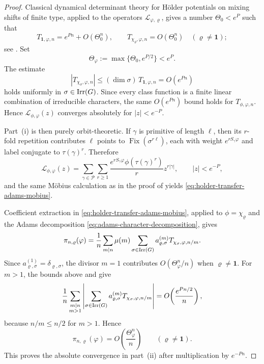 \begin{proof}
  Classical dynamical determinant theory for H\"older potentials on
  mixing shifts of finite type, applied to the operators
  \(\mathscr L_{\varphi,\varrho}\), gives a number \(\Theta_0<e^P\) such
  that
  \[
    T_{\mathbf 1,\varphi,n}=e^{Pn}+O(\Theta_0^n),
    \qquad
    T_{\chi_\varrho,\varphi,n}=O(\Theta_0^n)
    \quad (\varrho\neq\mathbf 1);
  \]
  see \cite{Ruelle1978Thermodynamic,Baladi2000PositiveTransfer,%
  Baladi2018ZetaDeterminants,AdachiSunada1987TwistedPerronFrobenius}.
  Set
  \[
    \Theta_\varphi:=\max\{\Theta_0,e^{P/2}\}<e^P.
  \]
  The estimate
  \[
    |T_{\chi_\sigma,\varphi,n}|
    \le (\dim\sigma)\,T_{\mathbf 1,\varphi,n}
    =O(e^{Pn})
  \]
  holds uniformly in \(\sigma\in\operatorname{Irr}(G)\). Since every class function is
  a finite linear combination of irreducible characters, the same
  \(O(e^{Pn})\) bound holds for \(T_{\phi,\varphi,n}\). Hence
  \(\mathcal L_{\phi,\varphi}(z)\) converges absolutely for
  \(|z|<e^{-P}\).

  Part~\textup{(i)} is then purely orbit-theoretic. If \(\gamma\) is
  primitive of length \(\ell\), then its \(r\)-fold repetition
  contributes \(\ell\) points to \(\operatorname{Fix}(\sigma^{r\ell})\),
  each with weight \(e^{rS_\gamma\varphi}\) and label conjugate to
  \(\tau(\gamma)^r\). Therefore
  \[
    \mathcal L_{\phi,\varphi}(z)
    =
    \sum_{\gamma\in\mathcal P}\sum_{r\ge 1}
      \frac{e^{rS_\gamma\varphi}\phi(\tau(\gamma)^r)}{r}z^{r|\gamma|},
    \qquad |z|<e^{-P},
  \]
  and the same M\"obius calculation as in the proof of
   yields
  \eqref{eq:holder-transfer-adams-mobius}.

  Coefficient extraction in
  \eqref{eq:holder-transfer-adams-mobius}, applied to
  \(\phi=\chi_\varrho\) and the Adams decomposition
  \eqref{eq:adams-character-decomposition}, gives
  \[
    \pi_{n,\varrho}(\varphi)
    =
    \frac{1}{n}\sum_{m\mid n}\mu(m)
      \sum_{\sigma\in\operatorname{Irr}(G)}
        a_{\varrho,\sigma}^{(m)}T_{\chi_\sigma,\varphi,n/m}.
  \]
  Since \(a_{\varrho,\sigma}^{(1)}=\delta_{\varrho,\sigma}\), the
  divisor \(m=1\) contributes \(O(\Theta_\varphi^n/n)\) when
  \(\varrho\neq\mathbf 1\). For \(m>1\), the bounds above and
   give
  \[
    \frac{1}{n}
    \sum_{\substack{m\mid n\\ m>1}}
      \left|
        \sum_{\sigma\in\operatorname{Irr}(G)}
          a_{\varrho,\sigma}^{(m)}T_{\chi_\sigma,\varphi,n/m}
      \right|
    =
    O\!\left(\frac{e^{Pn/2}}{n}\right),
  \]
  because \(n/m\le n/2\) for \(m>1\). Hence
  \[
    \pi_{n,\varrho}(\varphi)
    =O\!\left(\frac{\Theta_\varphi^n}{n}\right)
    \qquad (\varrho\neq\mathbf 1).
  \]
  This proves the absolute convergence in part~\textup{(ii)} after
  multiplication by \(e^{-Pn}\).


\end{proof}
